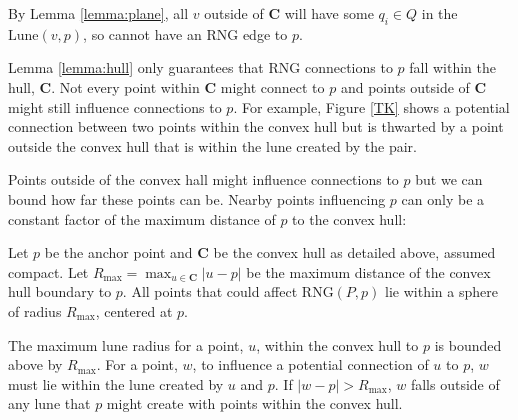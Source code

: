 \documentclass[a4paper,fleqn]{cas-dc}
\begin{document}
\begin{pf}
  By Lemma \ref{lemma:plane}, all $v$ outside of $\mathbf{C}$ will have some $q _ i \in Q$ in the $\text{Lune}(v,p)$, so cannot have an RNG edge to $p$.
\end{pf}

Lemma \ref{lemma:hull} only guarantees that RNG connections to $p$ fall within the hull, $\mathbf{C}$.
Not every point within $\mathbf{C}$ might connect to $p$ and points outside of $\mathbf{C}$ might still influence
connections to $p$.
For example, Figure \ref{TK} shows a potential connection between two points within the convex
hull but is thwarted by a point outside the convex hull that is within the lune created by the pair.

Points outside of the convex hall might influence connections to $p$ but we can bound how
far these points can be.
Nearby points influencing $p$ can only be a constant factor of the maximum distance of $p$ to the convex hull:

\begin{lemma}
  \label{lemma:extension}
  Let $p$ be the anchor point and $\mathbf{C}$ be the convex hull as detailed above, assumed compact.
  Let $R _ {\text{max}} = \max _ {u \in \mathbf{C}} |u-p|$ be the maximum distance of the convex hull boundary to $p$.
  All points that could affect $\text{RNG}(P,p)$ lie within a sphere of radius $R _ {\text{max}}$, centered at $p$.
\end{lemma}

\begin{pf}
  The maximum lune radius for a point, $u$, within the convex hull to $p$ is bounded above by $R _ {\text{max}}$.
  For a point, $w$, to influence a potential connection of $u$ to $p$, $w$ must lie within the lune created by
  $u$ and $p$.
  If $|w-p| > R _ {\text{max}}$, $w$ falls outside of any lune that $p$ might create with points within the convex
  hull.
\end{pf}


\end{document}

